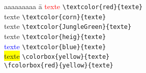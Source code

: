 \documentclass{article}
\newcommand*\circled[1]{\tikz[baseline=(char.base)]{
            \node[shape=circle,draw,inner sep=2pt] (char) {#1};}}
\let\code\lstinline
\begin{document}
\begin{multicols*}{3}
\begin{multicols*}{2}
\begin{tabbing}
    aaaaaaaaa \= a \kill
    \textcolor{red}{texte}               \> \code!\textcolor{red}{texte}!              \\
    \textcolor{corn}{texte}    \> \code!\textcolor{corn}{texte}!    \\
    \textcolor{JungleGreen}{texte} \> \code!\textcolor{JungleGreen}{texte}! \\
    \textcolor{heig}{texte}            \> \code!\textcolor{heig}{texte}!            \\
    \textcolor{blue}{texte}              \> \code!\textcolor{blue}{texte}!             \\
    \colorbox{yellow}{texte}            \> \code!\colorbox{yellow}{texte}!            \\
          \> \code!\fcolorbox{red}{yellow}{texte}!
\end{tabbing}
\end{multicols*}





\end{multicols*}
\end{document}
